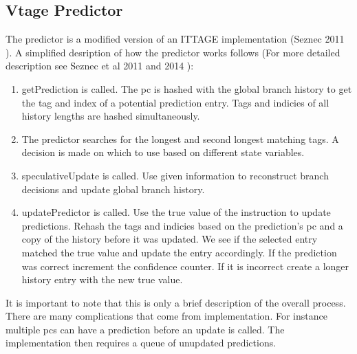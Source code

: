 \documentclass[12pt]{article}
\newcommand\tab[1][1cm]{\hspace*{#1}}
\begin{document}
\begin{multicols}{2}
\section{Vtage Predictor}
\tab The predictor is a modified version of an ITTAGE implementation (Seznec 2011 \cite{Seznec2011}). A simplified desription of how the predictor works follows (For more detailed description see Seznec et al 2011 \cite{Seznec2011} and 2014 \cite{Seznec2014}):
	\begin{enumerate}[label=Step \arabic*,leftmargin=*, align=left]
		\item getPrediction is called. The pc is hashed with the global branch history to get the tag and index of a potential prediction entry. Tags and indicies of all history lengths are hashed simultaneously.
		\item The predictor searches for the longest and second longest matching tags. A decision is made on which to use based on different state variables.
		\item speculativeUpdate is called. Use given information to reconstruct branch decisions and update global branch history.
		\item updatePredictor is called. Use the true value of the instruction to update predictions. Rehash the tags and indicies based on the prediction's pc and a copy of the history before it was updated. We see if the selected entry matched the true value and update the entry accordingly. If the prediction was correct increment the confidence counter. If it is incorrect create a longer history entry with the new true value.
	\end{enumerate}
	\tab It is important to note that this is only a brief description of the overall process. There are many complications that come from implementation. For instance multiple pcs can have a prediction before an update is called. The implementation then requires a queue of unupdated predictions.

\end{multicols}
\end{document}
